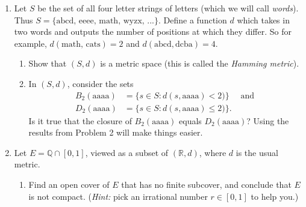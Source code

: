 \documentclass[12pt, letterpaper]{article}
\newcommand{\0}{\mathbf{0}}
\newcommand{\1}{\mathbf{1}}
\begin{document}
\begin{enumerate}
\begin{enumerate}
        \item 
        Show that $\overline{E}$ is the intersection of all closed subsets of $X$ containing $E$.

        \item 
        Show that for any $E, F \subset X$, we have $\overline{E \cup F} = \overline{E} \cup \overline{F}$ (this is much easier if you use part (b)).

        \item 
        Define the \textit{closed ball of radius $r$ centered at $x$} to be $D_r(x) = \{y \in X : d(y, x) \leq r\}$. Show that $D_r(x)$ is closed and that $\overline{B_r(x)} \subset D_r(x)$ (using part (b) is again much simpler here).
        
    \end{enumerate}

    \vspace{0.5cm}

    \item 
    Let $S$ be the set of all four letter strings of letters (which we will call \textit{words}). Thus $S = \{\text{abcd, eeee, math, wyzx, ...}\}$. Define a function $d$ which takes in two words and outputs the number of positions at which they differ. So for example, $d(\text{math, cats}) = 2$ and $d(\text{abcd}, \text{dcba}) = 4$.

    \begin{enumerate}
        \item
        Show that $(S, d)$ is a metric space (this is called the \textit{Hamming metric}).

        \item 
        In $(S, d)$, consider the sets
        \begin{align*}
            B_2(\text{aaaa}) &= \{s \in S : d(s, \text{aaaa}) < 2)\} \quad \text{ and }\\[5pt] D_2(\text{aaaa}) &= \{s \in S : d(s, \text{aaaa}) \leq 2)\}.
        \end{align*}
        Is it true that the closure of $B_2(\text{aaaa})$ equals $D_2(\text{aaaa})$? Using the results from Problem 2 will make things easier.
        
    \end{enumerate}

    \vspace{0.5cm}

    \item 
    Let $E = \mathbb{Q} \cap [0, 1]$, viewed as a subset of $(\mathbb{R}, d)$, where $d$ is the usual metric.
    \begin{enumerate}
        \item 
        Find an open cover of $E$ that has no finite subcover, and conclude that $E$ is not compact. (\textit{Hint:} pick an irrational number $r \in [0, 1]$ to help you.)


\end{enumerate}
\end{enumerate}
\end{document}
